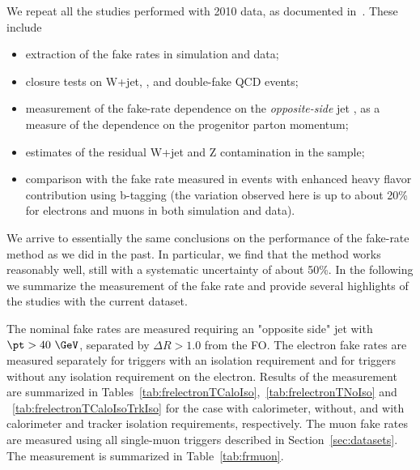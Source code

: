 We repeat all the studies performed with 2010 data, as documented in~\cite{ref:fakeRateNote}.
These include 
\begin{itemize}
\item extraction of the fake rates in simulation and data;
\item closure tests on W+jet, \ttbar, and double-fake QCD events;
\item measurement of the fake-rate dependence on the {\em opposite-side} jet \pt,
	as a measure of the dependence on the progenitor parton momentum;
\item estimates of the residual W+jet and Z contamination in the sample;
\item comparison with the fake rate measured in events with enhanced heavy flavor
	contribution using b-tagging (the variation observed here is up to about 20\% for electrons and
	muons in both simulation and data).
\end{itemize}
We arrive to essentially the same conclusions on the performance of the fake-rate method
as we did in the past.
In particular, we find that the method works reasonably well, still with a systematic
uncertainty of about 50\%.
In the following we summarize the measurement of the fake rate and provide several highlights
of the studies with the current dataset.

The nominal fake rates are measured requiring an "opposite side" jet with $\pt>40~\GeV$, 
separated by $\Delta R > 1.0$ from the FO.
The electron fake rates are measured separately for triggers with an isolation requirement and
for triggers without any isolation requirement on the electron.
Results of the measurement are summarized in Tables~\ref{tab:frelectronTCaloIso},~\ref{tab:frelectronTNoIso} and ~\ref{tab:frelectronTCaloIsoTrkIso}
for the case with calorimeter, without, and with calorimeter and tracker isolation requirements, respectively.
The muon fake rates are measured using all single-muon triggers described in Section~\ref{sec:datasets}.
The measurement is summarized in Table~\ref{tab:frmuon}.


